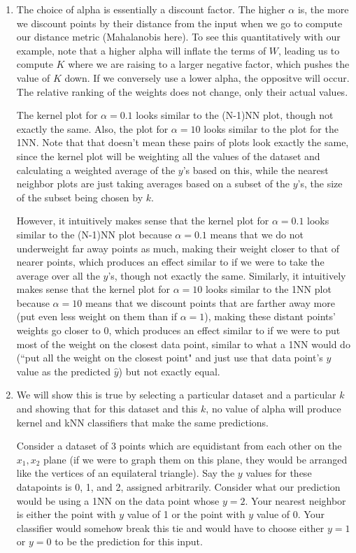\documentclass[submit]{harvardml}
\begin{document}
\begin{enumerate}
    \item The choice of alpha is essentially a discount factor. The higher $\alpha$ is, the more we discount points by their distance from the input when we go to compute our distance metric (Mahalanobis here). To see this quantitatively with our example, note that a higher alpha will inflate the terms of $W$, leading us to compute $K$ where we are raising to a larger negative factor, which pushes the value of $K$ down. If we conversely use a lower alpha, the oppositve will occur. The relative ranking of the weights does not change, only their actual values.

    The kernel plot for $\alpha=0.1$ looks similar to the (N-1)NN plot, though not exactly the same. Also, the plot for $\alpha=10$ looks similar to the plot for the 1NN. Note that that doesn't mean these pairs of plots look exactly the same, since the kernel plot will be weighting all the values of the dataset and calculating a weighted average of the $y$'s based on this, while the nearest neighbor plots are just taking averages based on a subset of the $y$'s, the size of the subset being chosen by $k$.

    However, it intuitively makes sense that the kernel plot for $\alpha=0.1$ looks similar to the (N-1)NN plot because $\alpha=0.1$ means that we do not underweight far away points as much, making their weight closer to that of nearer points, which produces an effect similar to if we were to take the average over all the $y$'s, though not exactly the same. Similarly, it intuitively makes sense that the kernel plot for $\alpha=10$ looks similar to the 1NN plot because $\alpha=10$ means that we discount points that are farther away more (put even less weight on them than if $\alpha=1$), making these distant points' weights go closer to 0, which produces an effect similar to if we were to put most of the weight on the closest data point, similar to what a 1NN would do (``put all the weight on the closest point" and just use that data point's $y$ value as the predicted $\hat{y}$) but not exactly equal.

    \item We will show this is true by selecting a particular dataset and a particular $k$ and showing that for this dataset and this $k$, no value of alpha will produce kernel and kNN classifiers that make the same predictions.

    Consider a dataset of 3 points which are equidistant from each other on the $x_1, x_2$ plane (if we were to graph them on this plane, they would be arranged like the vertices of an equilateral triangle). Say the $y$ values for these datapoints is 0, 1, and 2, assigned arbitrarily. Consider what our prediction would be using a 1NN on the data point whose $y=2$. Your nearest neighbor is either the point with $y$ value of 1 or the point with $y$ value of 0. Your classifier would somehow break this tie and would have to choose either $y=1$ or $y=0$ to be the prediction for this input.


\end{enumerate}
\end{document}
